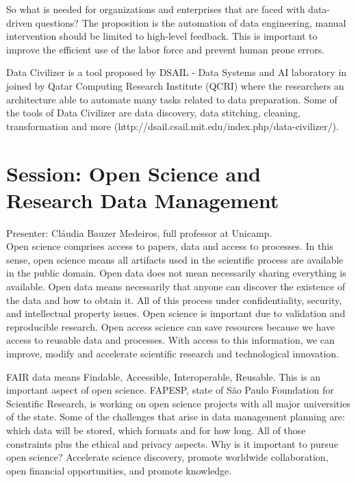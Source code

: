 \documentclass[9pt,a4paper]{article}
\begin{document}
So what is needed for organizations and enterprises that are faced with data-driven questions? The proposition is the automation of data engineering, manual intervention should be limited to high-level feedback. This is important to improve the efficient use of the labor force and prevent human prone errors.

Data Civilizer is a tool proposed by DSAIL - Data Systems and AI laboratory in joined by Qatar Computing Research Institute (QCRI) where the researchers an architecture able to automate many tasks related to data preparation. Some of the tools of Data Civilizer are data discovery, data stitching, cleaning, transformation and more (http://dsail.csail.mit.edu/index.php/data-civilizer/).

\section*{Session: Open Science  and  Research Data  Management}

Presenter: Cláudia Bauzer Medeiros, full professor at Unicamp.\\


Open science comprises access to papers, data and access to processes. 
In this sense, open science means all artifacts used in the scientific process are available in the public domain. 
Open data does not mean necessarily sharing everything is available. Open data means necessarily that anyone can discover the existence of the data and how to obtain it. All of this process under confidentiality, security, and intellectual property issues.
Open science is important due to validation and reproducible research. Open access science can save resources because we have access to reusable data and processes. With access to this information, we can improve, modify and accelerate scientific research and technological innovation. 

FAIR data means Findable, Accessible, Interoperable, Reusable. This is an important aspect of open science. 
FAPESP, state of São Paulo Foundation for Scientific Research, is working on open science projects with all major universities of the state. 
Some of the challenges that arise in data management planning are: which data will be stored, which formats and for how long. All of those constraints plus the ethical and privacy aspects. Why is it important to pursue open science? Accelerate science discovery, promote worldwide collaboration, open financial opportunities, and promote knowledge. 
\end{document}
